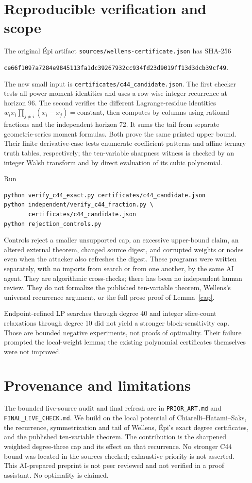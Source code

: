 \documentclass[11pt]{amsart}
\begin{document}
\section{Reproducible verification and scope}
The original \'Epi artifact \texttt{sources/wellens-certificate.json} has
SHA-256
\begin{center}\small
\texttt{ce66f1097a7284e9845113fa1dc39267932cc934fd23d9019ff13d3dcb39cf49}.
\end{center}
The new small input is \texttt{certificates/c44\_candidate.json}.
The first checker tests all power-moment identities and uses a row-wise
integer recurrence at horizon 96. The second verifies the different
Lagrange-residue identities
$w_i x_i\prod_{j\ne i}(x_i-x_j)=\text{constant}$, then computes by columns
using rational fractions and the independent horizon 72. It sums the tail
from separate geometric-series moment formulas. Both prove the same
printed upper bound. Their finite derivative-case tests enumerate
coefficient patterns and affine ternary truth tables, respectively;
the ten-variable sharpness witness is checked by an integer Walsh transform
and by direct evaluation of its cubic polynomial.

Run
\begin{verbatim}
python verify_c44_exact.py certificates/c44_candidate.json
python independent/verify_c44_fraction.py \
       certificates/c44_candidate.json
python rejection_controls.py
\end{verbatim}
Controls reject a smaller unsupported cap, an excessive upper-bound
claim, an altered external theorem, changed source digest, and corrupted
weights or nodes even when the attacker also refreshes the digest.
These programs were written separately, with no imports from search or
from one another, by the same AI agent. They are algorithmic cross-checks;
there has been no independent human review. They do not formalize the
published ten-variable theorem, Wellens's universal recurrence argument,
or the full prose proof of Lemma~\ref{cap}.

Endpoint-refined LP searches through degree 40 and integer slice-count
relaxations through degree 10 did not yield a stronger block-sensitivity
cap. Those are bounded negative experiments, not proofs of optimality.
Their failure prompted the local-weight lemma; the existing polynomial
certificates themselves were not improved.

\section*{Provenance and limitations}
The bounded live-source audit and final refresh are in
\texttt{PRIOR\_ART.md} and \texttt{FINAL\_LIVE\_CHECK.md}.
We build on the local potential of Chiarelli--Hatami--Saks, the recurrence,
symmetrization and tail of Wellens, \'Epi's exact degree certificates, and
the published ten-variable theorem. The contribution is the sharpened
weighted degree-three cap and its effect on that recurrence.
No stronger C44 bound was located in the sources checked; exhaustive
priority is not asserted. This AI-prepared preprint is not peer reviewed
and not verified in a proof assistant. No optimality is claimed.
\end{document}

